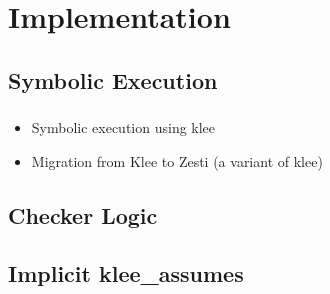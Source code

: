 \documentclass[mathserif,10pt]{beamer}
\newcommand{\cmt}[1]{}
\begin{document}
\section{Implementation}
\subsection{Symbolic Execution}
\frame
{
  \frametitle{\subsecname}
  \begin{itemize} 
    \item Symbolic execution using klee  
    \item Migration from Klee to Zesti (a variant of klee) 
    \cmt{
      To mitigate the path explosion problem, ZESTI carefully chooses divergent
        paths via two mechanisms: (1) it only diverges close to sensitive
        instructions (memory accesses and divisions.), i.e instructions that
        might contain a bug, and (2) it chooses the divergence points in order
        of increasing distance from the sensitive instruction. The key idea
        behind this approach is to exercise sensitive instructions on slightly
        different paths, with the goal of triggering a bug if the respective
        instructions contain one.  ZESTI identifies sensitive instructions
        dynamically while running the concrete input.  
    } 
  \end{itemize} 
}

\subsection{Checker Logic}
\frame
{
  \frametitle{\subsecname}
  \algoCheckerIII
    \cmt{
    This prevents zesti from interpreting the checker code (as now the checker code will be a part of the symbolic execution engine). 
    With this the run time performance is expected to improve.
    } 
}

\subsection{Implicit klee\_assumes}
\frame
{
  \frametitle{\subsecname}
  \lstII
    \cmt{
    Without the klee_assume, the dereference z->x may get resolved to many
      spurious memory objects. But while dealing with pointer analysis results
      we assume that the index of gptr is within bounds and as a result we are
      getting false positives that (The set of allocation sites corresponding
          to the memory object of the load address, z->x) is NOT a subset of
      (Points to allocation sites for the load address z->x) 
    }

}
\end{document}
